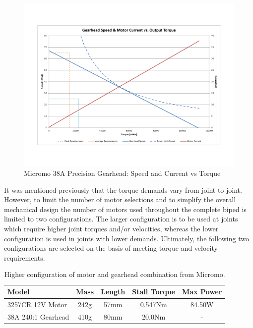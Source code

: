 \begin{figure}[!ht]
	\begin{center}
    \includegraphics[scale=0.6]{fig/ch5/gearhead1.pdf}
	\end{center}
  \caption{Micromo 38A Precision Gearhead: Speed and Current vs Torque}
\end{figure}

It was mentioned previously that the torque demands vary from joint to joint. However, to limit the number of motor selections and to simplify the overall mechanical design the number of motors used throughout the complete biped is limited to two configurations. The larger configuration is to be used at joints which require higher joint torques and/or velocities, whereas the lower configuration is used in joints with lower demands. Ultimately, the following two configurations are selected on the basis of meeting torque and velocity requirements. 


\begin{table}[!h]
  \centering
  \caption{Higher configuration of motor and gearhead combination from Micromo.}
    \begin{tabular}{lcccc}
    \addlinespace
    \toprule
    \textbf{Model} & \textbf{Mass} & \textbf{Length} & \textbf{Stall Torque} & \textbf{Max Power}\\
    \midrule
    3257CR 12V Motor	&	242g	&	57mm	&	0.547Nm		&	84.50W	\\
    38A 240:1 Gearhead	&	410g	&	80mm	&	20.0Nm		&	-	\\
    \bottomrule
    \end{tabular}%
  \label{tab:higherconfig}%
\end{table}%



